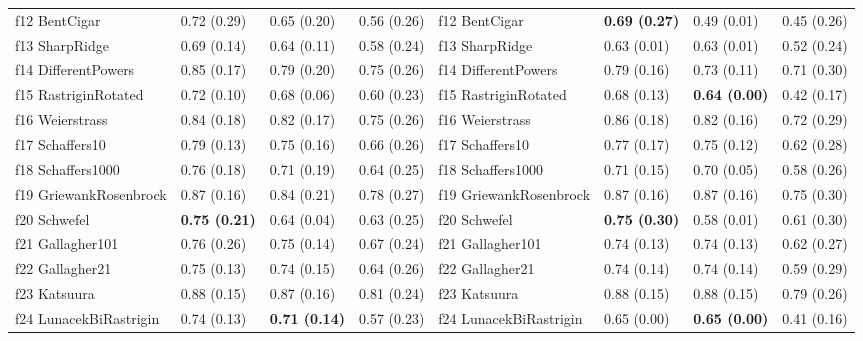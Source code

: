 \begin{table}
\begin{tabular}{llllllll}
f12 BentCigar & 0.72 (0.29) & 0.65 (0.20) & 0.56 (0.26) & f12 BentCigar & \textbf{0.69 (0.27)} & 0.49 (0.01) & 0.45 (0.26) \\
f13 SharpRidge & 0.69 (0.14) & 0.64 (0.11) & 0.58 (0.24) & f13 SharpRidge & 0.63 (0.01) & 0.63 (0.01) & 0.52 (0.24) \\
f14 DifferentPowers & 0.85 (0.17) & 0.79 (0.20) & 0.75 (0.26) & f14 DifferentPowers & 0.79 (0.16) & 0.73 (0.11) & 0.71 (0.30) \\
f15 RastriginRotated & 0.72 (0.10) & 0.68 (0.06) & 0.60 (0.23) & f15 RastriginRotated & 0.68 (0.13) & \textbf{0.64 (0.00)} & 0.42 (0.17) \\
f16 Weierstrass & 0.84 (0.18) & 0.82 (0.17) & 0.75 (0.26) & f16 Weierstrass & 0.86 (0.18) & 0.82 (0.16) & 0.72 (0.29) \\
f17 Schaffers10 & 0.79 (0.13) & 0.75 (0.16) & 0.66 (0.26) & f17 Schaffers10 & 0.77 (0.17) & 0.75 (0.12) & 0.62 (0.28) \\
f18 Schaffers1000 & 0.76 (0.18) & 0.71 (0.19) & 0.64 (0.25) & f18 Schaffers1000 & 0.71 (0.15) & 0.70 (0.05) & 0.58 (0.26) \\
f19 GriewankRosenbrock & 0.87 (0.16) & 0.84 (0.21) & 0.78 (0.27) & f19 GriewankRosenbrock & 0.87 (0.16) & 0.87 (0.16) & 0.75 (0.30) \\
f20 Schwefel & \textbf{0.75 (0.21)} & 0.64 (0.04) & 0.63 (0.25) & f20 Schwefel & \textbf{0.75 (0.30)} & 0.58 (0.01) & 0.61 (0.30) \\
f21 Gallagher101 & 0.76 (0.26) & 0.75 (0.14) & 0.67 (0.24) & f21 Gallagher101 & 0.74 (0.13) & 0.74 (0.13) & 0.62 (0.27) \\
f22 Gallagher21 & 0.75 (0.13) & 0.74 (0.15) & 0.64 (0.26) & f22 Gallagher21 & 0.74 (0.14) & 0.74 (0.14) & 0.59 (0.29) \\
f23 Katsuura & 0.88 (0.15) & 0.87 (0.16) & 0.81 (0.24) & f23 Katsuura & 0.88 (0.15) & 0.88 (0.15) & 0.79 (0.26) \\
f24 LunacekBiRastrigin & 0.74 (0.13) & \textbf{0.71 (0.14)} & 0.57 (0.23) & f24 LunacekBiRastrigin & 0.65 (0.00) & \textbf{0.65 (0.00)} & 0.41 (0.16) \\
\bottomrule
\end{tabular}
\end{table}
